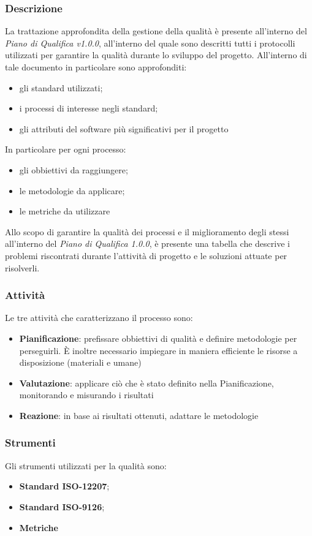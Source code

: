 		\subsubsection{Descrizione}
		La trattazione approfondita della gestione della qualità è presente all'interno del \textit{Piano di Qualifica v1.0.0}, all'interno del quale sono descritti tutti i protocolli utilizzati per garantire la qualità durante lo sviluppo del progetto. All'interno di tale documento in particolare sono approfonditi:
		\begin{itemize}
			\item gli standard utilizzati;
			\item i processi di interesse negli standard;
			\item gli attributi del software più significativi per il progetto
		\end{itemize}
		In particolare per ogni processo:
		\begin{itemize}
			\item gli obbiettivi da raggiungere;
			\item le metodologie da applicare;
			\item le metriche da utilizzare
		\end{itemize}
		Allo scopo di garantire la qualità dei processi e il miglioramento degli stessi all'interno del \textit{Piano di Qualifica 1.0.0}, è presente una tabella che descrive i problemi riscontrati durante l'attività di progetto e le soluzioni attuate per risolverli.		
		
		\subsubsection{Attività}
		Le tre attività che caratterizzano il processo sono:
		\begin{itemize}
			\item \textbf{Pianificazione}: prefissare obbiettivi di qualità e definire metodologie per perseguirli. È inoltre necessario impiegare in maniera efficiente le risorse a disposizione (materiali e umane)
			\item \textbf{Valutazione}: applicare ciò che è stato definito nella Pianificazione, monitorando e misurando i risultati
			\item \textbf{Reazione}: in base ai risultati ottenuti, adattare le metodologie
		\end{itemize}
		\subsubsection{Strumenti}
		Gli strumenti utilizzati per la qualità sono:
		\begin{itemize}
			\item \textbf{Standard ISO-12207};
			\item \textbf{Standard ISO-9126};
			\item \textbf{Metriche}
		\end{itemize}
	
